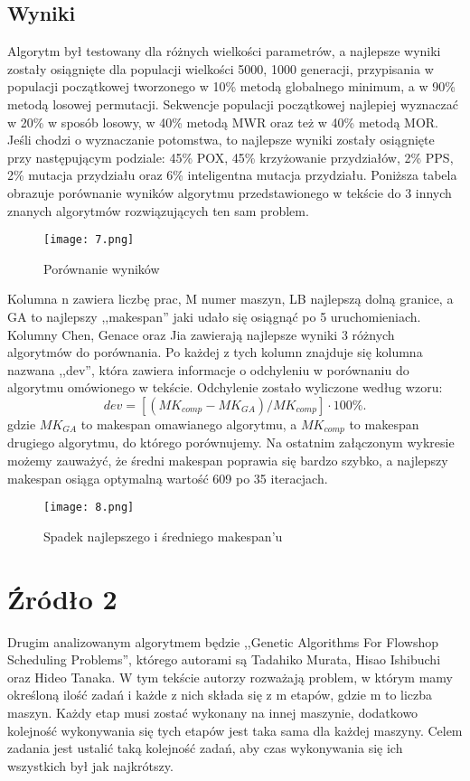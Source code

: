 \documentclass{article}
\begin{document}
 \subsection{Wyniki}
 Algorytm był testowany dla różnych wielkości parametrów, a najlepsze wyniki zostały osiągnięte dla populacji wielkości 5000, 1000 generacji, przypisania w populacji początkowej tworzonego w 10\% metodą globalnego minimum, a w 90\% metodą losowej permutacji. Sekwencje populacji początkowej najlepiej wyznaczać w 20\% w sposób losowy, w 40\% metodą MWR oraz też w 40\% metodą MOR. Jeśli chodzi o wyznaczanie potomstwa, to najlepsze wyniki zostały osiągnięte przy następującym podziale: 45\% POX, 45\% krzyżowanie przydziałów, 2\% PPS, 2\% mutacja przydziału oraz 6\% inteligentna mutacja przydziału. Poniższa tabela obrazuje porównanie wyników algorytmu przedstawionego w tekście do 3 innych znanych algorytmów rozwiązujących ten sam problem.
 \begin{figure}[H]
 \centering
 \texttt{[image: 7.png]}
 \caption{Porównanie wyników}
 \end{figure}
 Kolumna n zawiera liczbę prac, M numer maszyn, LB najlepszą dolną granice, a GA to najlepszy ,,makespan'' jaki udało się osiągnąć po 5 uruchomieniach. Kolumny
 Chen, Genace oraz Jia zawierają najlepsze wyniki 3 różnych algorytmów do porównania. Po każdej z tych kolumn znajduje się kolumna nazwana ,,dev'', która zawiera informacje o odchyleniu w porównaniu do algorytmu omówionego w tekście. Odchylenie zostało wyliczone według wzoru:
 \begin{equation}
 dev = [(MK_{comp}-MK_{GA})/MK_{comp}] \cdot 100\% .
 \end{equation}
 gdzie $MK_{GA}$ to makespan omawianego algorytmu, a $MK_{comp}$ to makespan drugiego algorytmu, do którego porównujemy.
 Na ostatnim załączonym wykresie możemy zauważyć, że średni makespan poprawia się bardzo szybko, a najlepszy makespan osiąga optymalną wartość 609 po 35 iteracjach.
 \begin{figure}[H]
 \centering
 \texttt{[image: 8.png]}
 \caption{Spadek najlepszego i średniego makespan'u}
 \end{figure}

\section{Źródło 2}
Drugim analizowanym algorytmem będzie ,,Genetic Algorithms For Flowshop Scheduling Problems'', którego autorami są Tadahiko Murata, Hisao Ishibuchi oraz Hideo Tanaka. W tym tekście autorzy rozważają problem, w którym mamy określoną ilość zadań i każde z nich składa się z m etapów, gdzie m to liczba maszyn. Każdy etap musi zostać wykonany na innej maszynie, dodatkowo kolejność wykonywania się tych etapów jest taka sama dla każdej maszyny. Celem zadania jest ustalić taką kolejność zadań, aby czas wykonywania się ich wszystkich był jak najkrótszy.
\end{document}
